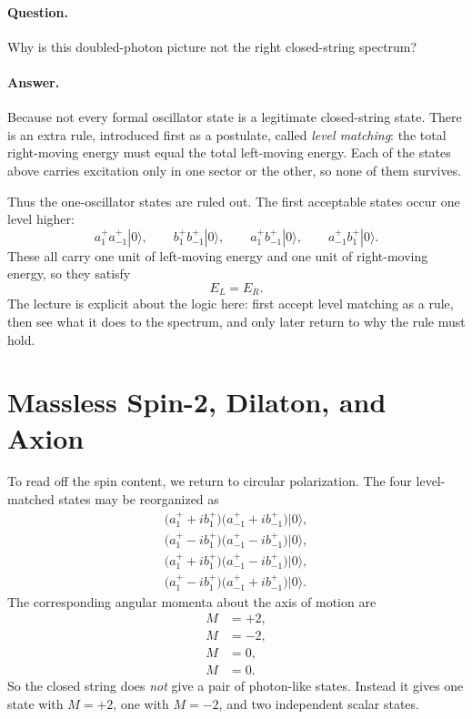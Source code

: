 \paragraph{Question.} Why is this doubled-photon picture not the right closed-string spectrum?

\paragraph{Answer.} Because not every formal oscillator state is a legitimate closed-string state. There is an extra rule, introduced first as a postulate, called \emph{level matching}: the total right-moving energy must equal the total left-moving energy. Each of the states above carries excitation only in one sector or the other, so none of them survives.

Thus the one-oscillator states are ruled out. The first acceptable states occur one level higher:
\begin{equation}
a_1^+a_{-1}^+|0\rangle,
\qquad
b_1^+b_{-1}^+|0\rangle,
\qquad
a_1^+b_{-1}^+|0\rangle,
\qquad
a_{-1}^+b_1^+|0\rangle.
\end{equation}
These all carry one unit of left-moving energy and one unit of right-moving energy, so they satisfy
\begin{equation}
E_L=E_R.
\end{equation}
The lecture is explicit about the logic here: first accept level matching as a rule, then see what it does to the spectrum, and only later return to why the rule must hold.

\section{Massless Spin-2, Dilaton, and Axion}

To read off the spin content, we return to circular polarization. The four level-matched states may be reorganized as
\begin{align}
\big(a_1^+ + i b_1^+\big)\big(a_{-1}^+ + i b_{-1}^+\big)|0\rangle, \\
\big(a_1^+ - i b_1^+\big)\big(a_{-1}^+ - i b_{-1}^+\big)|0\rangle, \\
\big(a_1^+ + i b_1^+\big)\big(a_{-1}^+ - i b_{-1}^+\big)|0\rangle, \\
\big(a_1^+ - i b_1^+\big)\big(a_{-1}^+ + i b_{-1}^+\big)|0\rangle.
\end{align}
The corresponding angular momenta about the axis of motion are
\begin{align}
M &= +2, \\
M &= -2, \\
M &= 0, \\
M &= 0.
\end{align}
So the closed string does \emph{not} give a pair of photon-like states. Instead it gives one state with \(M=+2\), one with \(M=-2\), and two independent scalar states.

